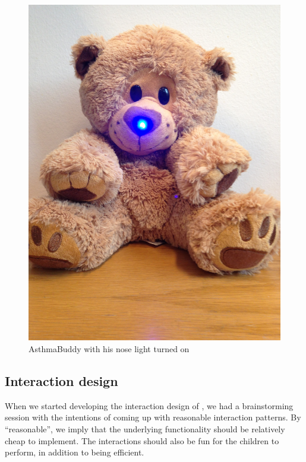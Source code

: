 \begin{figure}[H]
\begin{minipage}[t]{0.4\linewidth}
			\includegraphics[width=0.3\paperwidth]{Pictures/abbluelight.jpg}
		\caption{AsthmaBuddy with his nose light turned on}
		\label{fig:asthmabuddyandlightnose}
	\end{minipage}
\end{figure}


\subsection{Interaction design}
\label{sec:interactiondesign}
When we started developing the interaction design of \buddy{}, we had a brainstorming session with the intentions of coming up with reasonable interaction patterns.        
By ``reasonable'', we imply that the underlying functionality should be relatively cheap to implement. The interactions should also be fun for the children to perform, in addition to being efficient.  

